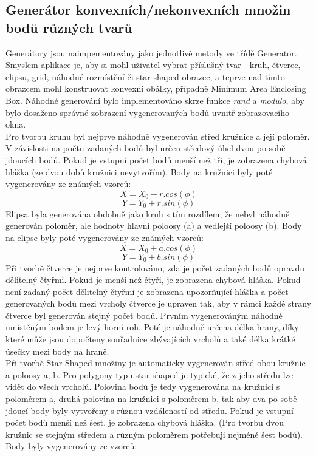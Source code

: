 \documentclass[a4paper,11pt,twoside]{article}
\begin{document}
\subsection{Generátor konvexních/nekonvexních množin bodů různých tvarů}
Generátory jsou naimpementovány jako jednotlivé metody ve třídě Generator. Smyslem aplikace je, aby si mohl uživatel vybrat příslušný tvar - kruh, čtverec, elipsu, grid, náhodné rozmístění či star shaped obrazec, a teprve nad tímto obrazcem mohl konstruovat konvexní obálky, případně Minimum Area Enclosing Box. Náhodné generování bylo implementováno skrze funkce \textit{rand} a \textit{modulo}, aby bylo dosaženo správné zobrazení vygenerovaných bodů uvnitř zobrazovacího okna. \\
\indent Pro tvorbu kruhu byl nejprve náhodně vygenerován střed kružnice a její poloměr. V závislosti na počtu zadaných bodů byl určen středový úhel dvou po sobě jdoucích bodů. Pokud je vstupní počet bodů menší než tři, je zobrazena chybová hláška (ze dvou dobů kružnici nevytvořím). Body na kružnici byly poté vygenerovány ze známých vzorců:
$$ X = X_0 + r.cos(\phi)$$
$$ Y = Y_0 + r.sin(\phi) $$
\noindent Elipsa byla generována obdobně jako kruh s tím rozdílem, že nebyl náhodně generován poloměr, ale hodnoty hlavní poloosy (a) a vedlejší poloosy (b).  Body na elipse byly poté vygenerovány ze známých vzorců:
$$ X = X_0 + a.cos(\phi)$$
$$ Y = Y_0 + b.sin(\phi) $$
\noindent Při tvorbě čtverce je nejprve kontrolováno, zda je počet zadaných bodů opravdu dělitelný čtyřmi. Pokud je menší než čtyři, je zobrazena chybová hláška. Pokud není zadaný počet dělitelný čtyřmi je zobrazena upozorňující hláška a počet generovaných bodů mezi vrcholy čtverce je upraven tak, aby v rámci každé strany čtverce byl generován stejný počet bodů. Prvním vygenerováným náhodně umístěným bodem je levý horní roh. Poté je náhodně určena délka hrany, díky které může jsou dopočteny souřadnice zbývajících vrcholů a také délka krátké úsečky mezi body na hraně. \\
\indent Při tvorbě Star Shaped množiny je automaticky vygenerován střed obou kružnic a poloosy a, b.  Pro polygony typu star shaped je typické, že z jeho středu lze vidět do všech vrcholů. Polovina bodů je tedy vygenerována na kružnici s poloměrem a, druhá polovina na kružnici s poloměrem b, tak aby dva po sobě jdoucí body byly vytvořeny s různou vzdáleností od středu. Pokud je vstupní počet bodů menší než šest, je zobrazena chybová hláška. (Pro tvorbu dvou kružnic se stejným středem a různým poloměrem potřebuji nejméně šest bodů). Body byly vygenerovány ze vzorců:
\end{document}
